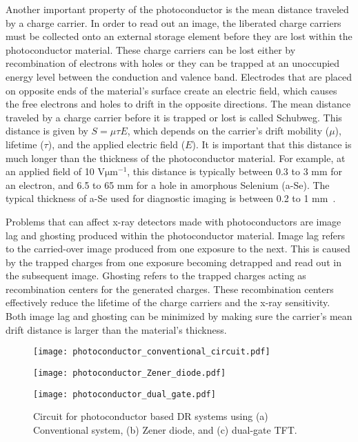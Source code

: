 Another important property of the photoconductor is the mean distance traveled by a charge carrier.  In order to read out an image, the liberated charge carriers must be collected onto an external storage element before they are lost within the photoconductor material.  These charge carriers can be lost either by recombination of electrons with holes or they can be trapped at an unoccupied energy level between the conduction and valence band.  Electrodes that are placed on opposite ends of the material's surface create an electric field, which causes the free electrons and holes to drift in the opposite directions.  The mean distance traveled by a charge carrier before it is trapped or lost is called Schubweg.  This distance is given by $S = \mu \tau E$, which depends on the carrier's drift mobility ($\mu$), lifetime ($\tau$), and the applied electric field ($E$).  It is important that this distance is much longer than the thickness of the photoconductor material.  For example, at an applied field of 10 $\mathrm{V \mu m^{-1}}$, this distance is typically between 0.3 to 3 mm for an electron, and 6.5 to 65 mm for a hole in amorphous Selenium (a-Se).  The typical thickness of a-Se used for diagnostic imaging is between 0.2 to 1 mm~\citep{Rowlands2000}.

Problems that can affect x-ray detectors made with photoconductors are image lag and ghosting produced within the photoconductor material.  Image lag refers to the carried-over image produced from one exposure to the next.  This is caused by the trapped charges from one exposure becoming detrapped and read out in the subsequent image.  Ghosting refers to the trapped charges acting as recombination centers for the generated charges.  These recombination centers effectively reduce the lifetime of the charge carriers and the x-ray sensitivity.  Both image lag and ghosting can be minimized by making sure the carrier's mean drift distance is larger than the material's thickness.

\begin{figure}[h]
	\noindent \begin{minipage}[b]{0.4\textwidth}
		\centering
		\texttt{[image: photoconductor\_conventional\_circuit.pdf]}
		\subcaption{}
	\end{minipage}
	\hspace{2cm}
	\begin{minipage}[b]{0.4\textwidth}
		\centering
		\texttt{[image: photoconductor\_Zener\_diode.pdf]}
		\subcaption{}
	\end{minipage}
	
	\centering
	\begin{minipage}[b]{0.3\textwidth}
		\texttt{[image: photoconductor\_dual\_gate.pdf]}
		\subcaption{}
	\end{minipage}
	\caption{Circuit for photoconductor based DR systems using (a) Conventional system, (b) Zener diode, and (c) dual-gate TFT.}
	\label{fig:photoconductor_circuit}
\end{figure}

